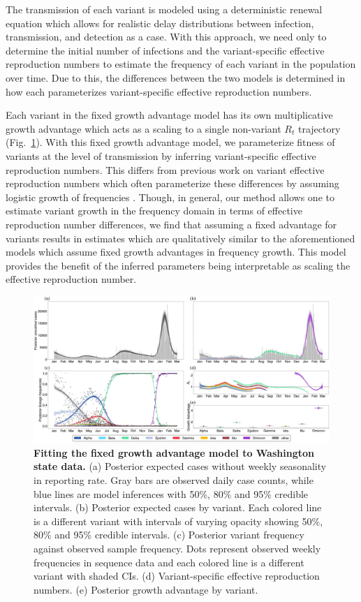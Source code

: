 The transmission of each variant is modeled using a deterministic renewal equation which allows for realistic delay distributions between infection, transmission, and detection as a case.
With this approach, we need only to determine the initial number of infections and the variant-specific effective reproduction numbers to estimate the frequency of each variant in the population over time.
Due to this, the differences between the two models is determined in how each parameterizes variant-specific effective reproduction numbers.

Each variant in the fixed growth advantage model has its own multiplicative growth advantage which acts as a scaling to a single non-variant $R_{t}$ trajectory (Fig.~\ref{fig:fixed_growth_Washington}).
With this fixed growth advantage model, we parameterize fitness of variants at the level of transmission by inferring variant-specific effective reproduction numbers.
This differs from previous work on variant effective reproduction numbers which often parameterize these differences by assuming logistic growth of frequencies \cite{Earnest2021, vohringer2021genomic}.
Though, in general, our method allows one to estimate variant growth in the frequency domain in terms of effective reproduction number differences, we find that assuming a fixed advantage for variants results in estimates which are qualitatively similar to the aforementioned models which assume fixed growth advantages in frequency growth.
This model provides the benefit of the inferred parameters being interpretable as scaling the effective reproduction number.

\begin{figure}[h!]
  \centering
  \includegraphics[width=\linewidth]{figs/fixed_growth_Washington.png}
  \caption{\textbf{Fitting the fixed growth advantage model to Washington state data.}
  (a) Posterior expected cases without weekly seasonality in reporting rate.
  Gray bars are observed daily case counts, while blue lines are model inferences with 50\%, 80\% and 95\% credible intervals.
  (b) Posterior expected cases by variant.
  Each colored line is a different variant with intervals of varying opacity showing 50\%, 80\% and 95\% credible intervals.
  (c) Posterior variant frequency against observed sample frequency.
  Dots represent observed weekly frequencies in sequence data and each colored line is a different variant with shaded CIs.
  (d) Variant-specific effective reproduction numbers.
  (e) Posterior growth advantage by variant.
  }
  \label{fig:fixed_growth_Washington}
\end{figure}

